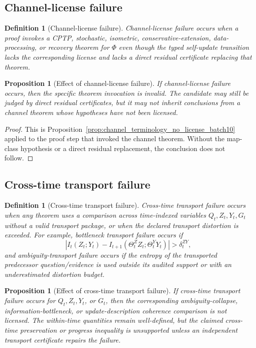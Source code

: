 \documentclass[11pt]{article}
\newtheorem{proposition}[theorem]{Proposition}
\newtheorem{definition}[theorem]{Definition}
\newcommand{\1}{\mathbf{1}}
\begin{document}
\subsection{Channel-license failure}

\begin{definition}[Channel-license failure]
Channel-license failure occurs when a proof invokes a CPTP, stochastic, isometric, conservative-extension, data-processing, or recovery theorem for \(\Phi\) even though the typed self-update transition lacks the corresponding license and lacks a direct residual certificate replacing that theorem.
\end{definition}

\begin{proposition}[Effect of channel-license failure]
If channel-license failure occurs, then the specific theorem invocation is invalid.  The candidate may still be judged by direct residual certificates, but it may not inherit conclusions from a channel theorem whose hypotheses have not been licensed.
\end{proposition}

\begin{proof}
This is Proposition~\ref{prop:channel_terminology_no_license_batch10} applied to the proof step that invoked the channel theorem.  Without the map-class hypothesis or a direct residual replacement, the conclusion does not follow.
\end{proof}

\subsection{Cross-time transport failure}

\begin{definition}[Cross-time transport failure]
Cross-time transport failure occurs when any theorem uses a comparison across time-indexed variables \(Q_t,Z_t,Y_t,G_t\) without a valid transport package, or when the declared transport distortion is exceeded. For example, bottleneck transport failure occurs if
\[
\left|
I_t(Z_t;Y_t)-I_{t+1}(\Theta_t^Z Z_t;\Theta_t^Y Y_t)
\right|>\delta_t^{ZY},
\]
and ambiguity-transport failure occurs if the entropy of the transported predecessor question/evidence is used outside its audited support or with an underestimated distortion budget.
\end{definition}

\begin{proposition}[Effect of cross-time transport failure]
If cross-time transport failure occurs for \(Q_t,Z_t,Y_t\), or \(G_t\), then the corresponding ambiguity-collapse, information-bottleneck, or update-description coherence comparison is not licensed. The within-time quantities remain well-defined, but the claimed cross-time preservation or progress inequality is unsupported unless an independent transport certificate repairs the failure.
\end{proposition}
\end{document}
